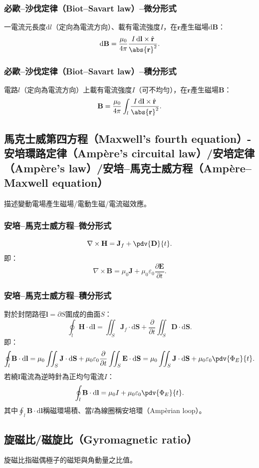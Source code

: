 \documentclass[a4paper,12pt]{report}
\begin{document}
\begin{itemize}
\subsubsection{必歐–沙伐定律（Biot–Savart law）–微分形式}
一電流元長度$\mathrm{d}l$（定向為電流方向）、載有電流強度$I$，在$\mathbf{r}$產生磁場$\mathrm{d}\mathbf{B}$：
\[\mathrm{d}\mathbf{B}=\frac{\mu_0}{4\pi}\frac{I\,\mathrm{d}\mathbf{l}\times\hat{\mathbf{r}}}{\abs{\mathbf{r}}^2}.\]
\subsubsection{必歐–沙伐定律（Biot–Savart law）–積分形式}
電路$l$（定向為電流方向）上載有電流強度$I$（可不均勻），在$\mathbf{r}$產生磁場$\mathbf{B}$：
\[\mathbf{B}=\frac{\mu_0}{4\pi}\int_{l}\frac{I\,\mathrm{d}\mathbf{l}\times\hat{\mathbf{r}}}{\abs{\mathbf{r}}^2}.\]
\subsection{馬克士威第四方程（Maxwell's fourth equation）-安培環路定律（Ampère's circuital law）/安培定律（Ampère's law）/安培–馬克士威方程（Ampère–Maxwell equation）}
描述變動電場產生磁場/電動生磁/電流磁效應。
\subsubsection{安培–馬克士威方程–微分形式}
\[\nabla \times \mathbf{H} = \mathbf{J}_f + \pdv{\mathbf{D}}{t}.\]
即：
\[\nabla\times\mathbf{B}=\mu_0\mathbf{J}+\mu_0\varepsilon_0\frac{\partial\mathbf{E}}{\partial t}.\]
\subsubsection{安培–馬克士威方程–積分形式}
對於封閉路徑$\mathbf{l}=\partial S$圍成的曲面$S$：
\[\oint_{l}\mathbf{H}\cdot\mathrm{d}\mathbf{l}=\iint_S\mathbf{J}_f\cdot\mathrm{d}\mathbf{S}+\frac{\partial}{\partial t}\iint_S\mathbf{D}\cdot\mathrm{d}\mathbf{S}.\]
即：
\[\oint_{l}\mathbf{B}\cdot\mathrm{d}\mathbf{l}=\mu_0\iint_S\mathbf{J}\cdot\mathrm{d}\mathbf{S}+\mu_0\varepsilon_0\frac{\partial}{\partial t}\iint_S\mathbf{E}\cdot\mathrm{d}\mathbf{S}=\mu_0\iint_S\mathbf{J}\cdot\mathrm{d}\mathbf{S}+\mu_0\varepsilon_0\pdv{\Phi_E}{t}.\]
若繞$\mathbf{l}$電流為逆時針為正均勻電流$I$：
\[\oint_{l}\mathbf{B}\cdot\mathrm{d}\mathbf{l}=\mu_0I+\mu_0\varepsilon_0\pdv{\Phi_E}{t}.\]
其中$\oint_{l}\mathbf{B}\cdot\mathrm{d}\mathbf{l}$稱磁環場積、當$l$為線圈稱安培環（Ampèrian loop）。
\subsection{旋磁比/磁旋比（Gyromagnetic ratio）}
旋磁比指磁偶極子的磁矩與角動量之比值。

\end{itemize}
\end{document}

